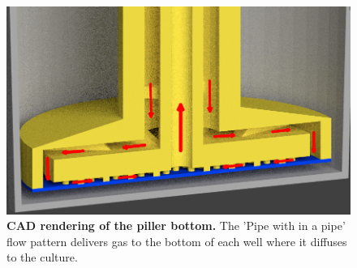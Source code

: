 
\begin{figure}
\includegraphics[scale=0.2]{../presentation-figures/piller-well-render-with-arrows.png} %
\caption{
{\bf CAD rendering of the piller bottom.} The 'Pipe with in a pipe' flow pattern delivers gas to the bottom of each well where it diffuses to the culture.  
}
\label{piller-well-render-figure}
\end{figure}

